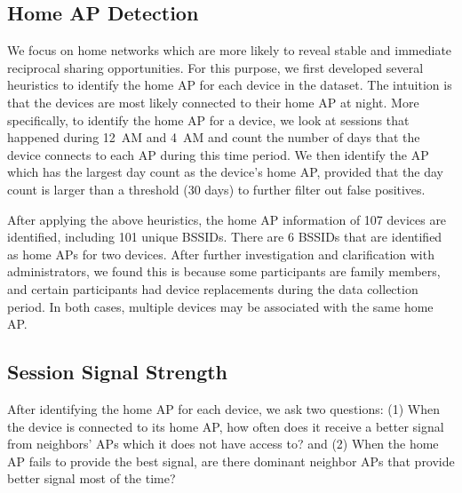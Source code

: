 \subsection{Home AP Detection}
\label{subsec:homeap}

We focus on home \wifi{} networks which are more likely to reveal stable and
immediate reciprocal sharing opportunities. For this purpose, we first developed
several heuristics to identify the home AP for each device in the dataset. The
intuition is that the devices are most likely connected to their home AP at
night. More specifically, to identify the home AP for a device, we look at
\wifi{} sessions that happened during 12~AM and 4~AM and count the number of
days that the device connects to each AP during this time period. We then
identify the AP which has the largest day count as the device's home AP,
provided that the day count is larger than a threshold (30 days) to further
filter out false positives.

After applying the above heuristics, the home AP information of 107 devices are
identified, including 101 unique BSSIDs. There are 6 BSSIDs that are identified
as home APs for two devices. After further investigation and clarification with
\PhoneLab{} administrators, we found this is because some participants are family
members, and certain participants had device replacements during the data
collection period. In both cases, multiple devices may be associated with the
same home AP.

\subsection{\wifi{} Session Signal Strength}
\label{subsec:better}

After identifying the home AP for each device, we ask two questions: (1) When
the device is connected to its home AP, how often does it receive a better signal
from neighbors' APs which it does not have access to? and (2) When the home AP
fails to provide the best signal, are there dominant neighbor APs
that provide better signal most of the time?



